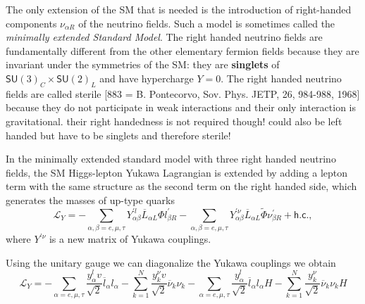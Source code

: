 
 The only extension of the SM that is needed is the introduction of right-handed components $\nu_{\alpha R}$ of the neutrino fields. Such a model is sometimes called the \textit{minimally extended Standard Model}. The right handed neutrino fields are fundamentally different from the other elementary fermion fields because they are invariant under the symmetries of the SM: they are \textbf{singlets} of $\textsf{SU}(3)_C\times\textsf{SU}(2)_L$ and have hypercharge $Y=0$. The right handed neutrino fields are called sterile [883 = B. Pontecorvo, Sov. Phys. JETP, 26, 984-988, 1968] because they do not participate in weak interactions and their only interaction is gravitational. their right handedness is not required though! could also be left handed but have to be singlets and therefore sterile!

In the minimally extended standard model with three right handed neutrino fields, the SM Higgs-lepton Yukawa Lagrangian is extended by adding a lepton term with the same structure as the second term on the right handed side, which generates the masses of up-type quarks
\begin{equation}
\mathcal{L}_Y=
-\sum_{\alpha,\beta=e,\mu,\tau} Y_{\alpha\beta}^{\prime l} \overline{L}_{\alpha L}\Phi l_{\beta R}^{\prime}
-\sum_{\alpha,\beta=e,\mu,\tau} Y_{\alpha\beta}^{\prime \nu} \overline{L}_{\alpha L}\tilde{\Phi} \nu_{\beta R}^{\prime}
+\textsf{h.c.},
\end{equation}
where $Y^{\prime \nu}$ is a new matrix of Yukawa couplings.

Using the unitary gauge we can diagonalize the Yukawa couplings we obtain
\begin{equation}
\mathcal{L}_Y=
-\sum_{\alpha=e,\mu,\tau}\frac{y_\alpha^l v}{\sqrt{2}}\overline{l}_\alpha l_\alpha
-\sum_{k=1}^N \frac{y_k^\nu v}{\sqrt{2}}\overline{\nu}_k\nu_k
-\sum_{\alpha=e,\mu,\tau}\frac{y_\alpha^l}{\sqrt{2}}\overline{l}_\alpha l_\alpha H
-\sum_{k=1}^N \frac{y_k^\nu}{\sqrt{2}}\overline{\nu}_k\nu_k H
\end{equation}

